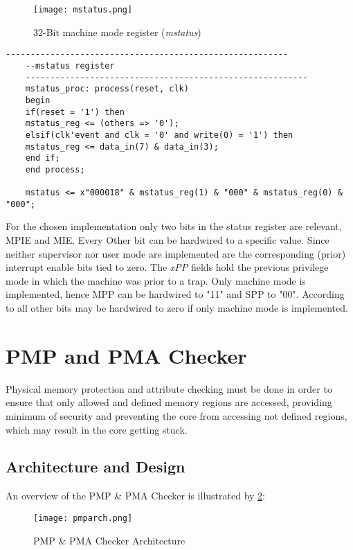 \begin{figure}[H]
	\centering
	\texttt{[image: mstatus.png]}
	\caption{32-Bit machine mode register (\textit{mstatus}) \cite{riscv:privileged}}
	\label{fig:mstatus}
\end{figure}

\begin{lstlisting}[style=vhdl, caption=mstatus implementation]
	---------------------------------------------------------
	--mstatus register
	---------------------------------------------------------
	mstatus_proc: process(reset, clk)
	begin
	if(reset = '1') then
	mstatus_reg <= (others => '0');
	elsif(clk'event and clk = '0' and write(0) = '1') then
	mstatus_reg <= data_in(7) & data_in(3);
	end if;
	end process;
	
	mstatus <= x"000018" & mstatus_reg(1) & "000" & mstatus_reg(0) & "000";
\end{lstlisting}

For the chosen implementation only two bits in the status register are relevant, \ac{MPIE} and \ac{MIE}. Every Other bit can be hardwired to a specific value. Since neither supervisor nor user mode are implemented are the corresponding (prior) interrupt enable bits tied to zero. The \textit{xPP} fields hold the previous privilege mode in which the machine was prior to a trap. Only machine mode is implemented, hence \ac{MPP} can be hardwired to "11" and \ac{SPP} to "00". According to \cite{riscv:privileged} all other bits may be hardwired to zero if only machine mode is implemented. \\
\clearpage
\section{PMP and PMA Checker}
Physical memory protection and attribute checking must be done in
order to ensure that only allowed and defined memory regions are accessed, providing
minimum of security and preventing the core from accessing not defined regions, which
may result in the core getting stuck.\\


\subsection{Architecture and Design}
An overview of the \ac{PMP} \& \ac{PMA} Checker is illustrated by \ref{fig:pmparch}:

\begin{figure}[H]
	\centering
	\texttt{[image: pmparch.png]}
	\caption{PMP \& PMA Checker Architecture}
	\label{fig:pmparch}
\end{figure}


